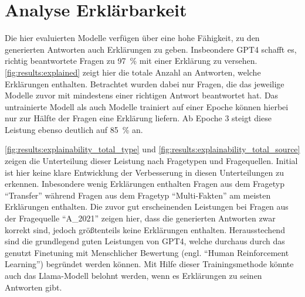 \section{Analyse Erklärbarkeit}\label{sec:results:explainability}
Die hier evaluierten Modelle verfügen über eine hohe Fähigkeit, zu den generierten Antworten auch Erklärungen zu geben.
Insbeondere GPT4 schafft es, richtig beantwortete Fragen zu \SI{97}{\percent} mit einer Erklärung zu versehen.
\cref{fig:results:explained} zeigt hier die totale Anzahl an Antworten, welche Erklärungen enthalten.
Betrachtet wurden dabei nur Fragen, die das jeweilige Modelle zuvor mit mindestens einer richtigen Antwort beantwortet hat.
Das untrainierte Modell als auch Modelle trainiert auf einer Epoche können hierbei nur zur Hälfte der Fragen eine Erklärung liefern.
Ab Epoche 3 steigt diese Leistung ebenso deutlich auf \SI{85}{\percent} an.\\


\cref{fig:results:explainability_total_type} und \cref{fig:results:explainability_total_source} zeigen die Unterteilung dieser Leistung nach Fragetypen und Fragequellen.
Initial ist hier keine klare Entwicklung der Verbesserung in diesen Unterteilungen zu erkennen.
Inbesondere wenig Erklärungen enthalten Fragen aus dem Fragetyp \enquote{Transfer} während Fragen aus dem Fragetyp \enquote{Multi-Fakten} am meisten Erklärungen enthalten.
Die zuvor gut erscheinenden Leistungen bei Fragen aus der Fragequelle \enquote{A\_2021} zeigen hier, dass die generierten Antworten zwar korrekt sind, jedoch größtenteils keine Erklärungen enthalten.
Herausstechend sind die grundlegend guten Leistungen von GPT4, welche durchaus durch das genutzt Finetuning mit Menschlicher Bewertung (engl.
\enquote{Human Reinforcement Learning}) begründet werden können.
Mit Hilfe dieser Trainingsmethode könnte auch das Llama-Modell belohnt werden, wenn es Erklärungen zu seinen Antworten gibt.\\


